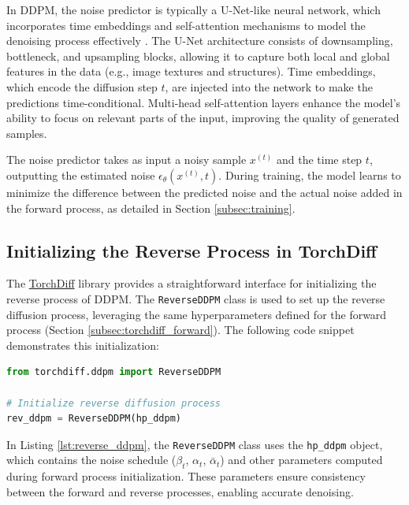 \documentclass[12pt]{article}
\begin{document}
In DDPM, the noise predictor is typically a U-Net-like neural network, which incorporates time embeddings and self-attention mechanisms to model the denoising process effectively \cite{ho2020}. The U-Net architecture consists of downsampling, bottleneck, and upsampling blocks, allowing it to capture both local and global features in the data (e.g., image textures and structures). Time embeddings, which encode the diffusion step \( t \), are injected into the network to make the predictions time-conditional. Multi-head self-attention layers enhance the model’s ability to focus on relevant parts of the input, improving the quality of generated samples.

The noise predictor takes as input a noisy sample \( x^{(t)} \) and the time step \( t \), outputting the estimated noise \( \epsilon_\theta(x^{(t)}, t) \). During training, the model learns to minimize the difference between the predicted noise and the actual noise added in the forward process, as detailed in Section \ref{subsec:training}.

\subsection{Initializing the Reverse Process in TorchDiff}
\label{subsec:torchdiff_reverse}

The \href{https://torchdiff.readthedocs.io}{TorchDiff} library provides a straightforward interface for initializing the reverse process of DDPM. The \texttt{ReverseDDPM} class is used to set up the reverse diffusion process, leveraging the same hyperparameters defined for the forward process (Section \ref{subsec:torchdiff_forward}). The following code snippet demonstrates this initialization:

\begin{lstlisting}[language=Python, caption={Initializing the reverse process in TorchDiff.}, label={lst:reverse_ddpm}]
from torchdiff.ddpm import ReverseDDPM

# Initialize reverse diffusion process
rev_ddpm = ReverseDDPM(hp_ddpm)
\end{lstlisting}

In Listing \ref{lst:reverse_ddpm}, the \texttt{ReverseDDPM} class uses the \texttt{hp\_ddpm} object, which contains the noise schedule (\( \beta_t \), \( \alpha_t \), \( \bar{\alpha}_t \)) and other parameters computed during forward process initialization. These parameters ensure consistency between the forward and reverse processes, enabling accurate denoising.
\end{document}
